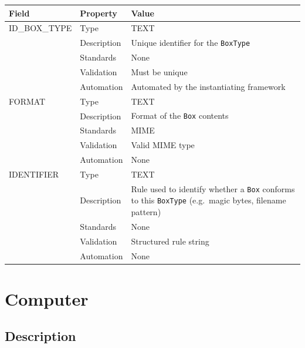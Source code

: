 \documentclass[
]{article}
\newcounter{none} %
\begin{document}
{\def\LTcaptype{none} %
\begin{longtable}[]{@{}
  >{\raggedright\arraybackslash}p{}
  >{\raggedright\arraybackslash}p{}
  >{\raggedright\arraybackslash}p{}@{}}
\toprule\noalign{}
\begin{minipage}[b]{\linewidth}\raggedright
Field
\end{minipage} & \begin{minipage}[b]{\linewidth}\raggedright
Property
\end{minipage} & \begin{minipage}[b]{\linewidth}\raggedright
Value
\end{minipage} \\
\midrule\noalign{}
\endhead
\bottomrule\noalign{}
\endlastfoot
ID\_BOX\_TYPE & Type & TEXT \\
& Description & Unique identifier for the \texttt{BoxType} \\
& Standards & None \\
& Validation & Must be unique \\
& Automation & Automated by the instantiating framework \\
FORMAT & Type & TEXT \\
& Description & Format of the \texttt{Box} contents \\
& Standards & MIME \\
& Validation & Valid MIME type \\
& Automation & None \\
IDENTIFIER & Type & TEXT \\
& Description & Rule used to identify whether a \texttt{Box} conforms to
this \texttt{BoxType} (e.g.~magic bytes, filename pattern) \\
& Standards & None \\
& Validation & Structured rule string \\
& Automation & None \\
\end{longtable}
}

\section{Computer}\label{computer}

\subsection{Description}\label{description-6}
\end{document}
